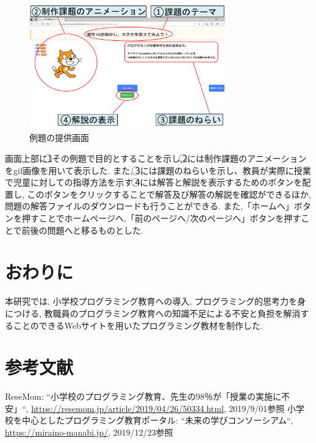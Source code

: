 \documentclass[twocolumn,10pt,a4j]{jsarticle}
\begin{document}
\begin{figure}[h]
\begin{center}
\includegraphics[clip,width=85mm,height=55mm]{zu1.pdf}
\end{center}
\caption{例題の提供画面}
\label{fig:教科書}
\end{figure}

画面上部に\textcircled{\scriptsize 1}その例題で目的とすることを示し,\textcircled{\scriptsize 2}には制作課題のアニメーションをgif画像を用いて表示した. また, \textcircled{\scriptsize 3}には課題のねらいを示し、教員が実際に授業で児童に対しての指導方法を示す.\textcircled{\scriptsize 4}には解答と解説を表示するためのボタンを配置し, このボタンをクリックすることで解答及び解答の解説を確認ができるほか, 問題の解答ファイルのダウンロードも行うことができる. また,「ホームへ」ボタンを押すことでホームページへ,「前のページへ/次のページへ」ボタンを押すことで前後の問題へと移るものとした.

\section{おわりに}
本研究では, 小学校プログラミング教育への導入, プログラミング的思考力を身につける, 教職員のプログラミング教育への知識不足による不安と負担を解消することのできるWebサイトを用いたプログラミング教材を制作した.

\section{参考文献}
\begin{thebibliography}{99}
 ReseMom: ``小学校のプログラミング教育、先生の98％が「授業の実施に不安」``, \url{https://resemom.jp/article/2019/04/26/50334.html}, 2019/9/01参照
 小学校を中心としたプログラミング教育ポータル: ``未来の学びコンソーシアム``, \url{https://miraino-manabi.jp/}, 2019/12/23参照
\end{thebibliography}
\end{document}
